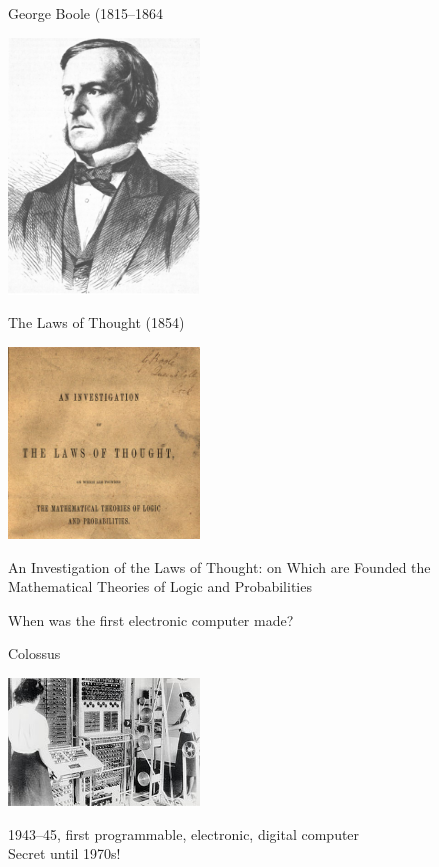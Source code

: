\documentclass[xcolor={usenames,dvipsnames,svgnames,table},12pt]{beamer}
\begin{document}
\begin{frame}{George Boole (1815--1864}
  \begin{center}
    \includegraphics[width=2in]{Portrait_of_George_Boole}
  \end{center}
\end{frame}

\begin{frame}{The Laws of Thought (1854)}
  \begin{center}
    \includegraphics[width=2in]{lawsofthought}

    An Investigation of the Laws of Thought: on Which are Founded the
    Mathematical Theories of Logic and Probabilities
  \end{center}
\end{frame}

\begin{frame}{}
  \begin{center}
    When was the first electronic computer made?
  \end{center}
\end{frame}

\begin{frame}{Colossus}
  \begin{center}
    \includegraphics[width=2in]{Colossus}

    1943--45, first programmable, electronic, digital computer \\
    Secret until 1970s!
  \end{center}
\end{frame}
\end{document}
